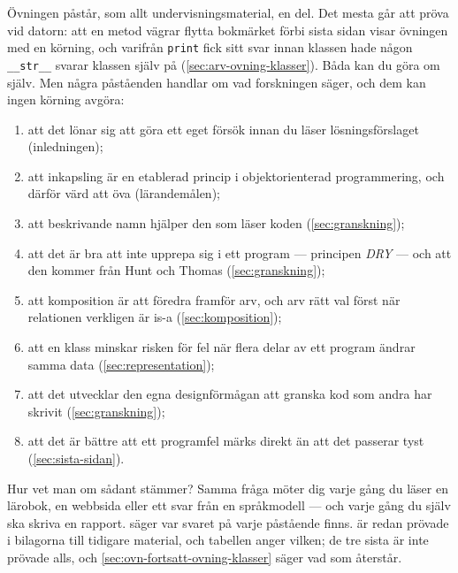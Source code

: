 Övningen påstår, som allt undervisningsmaterial, en del.  Det mesta går
att pröva vid datorn: att en metod vägrar flytta bokmärket förbi sista
sidan visar övningen med en körning, och varifrån
\texttt{print} fick sitt svar innan klassen hade någon
\texttt{__str__} svarar klassen själv på
(\cref{sec:arv-ovning-klasser}).  Båda kan du göra om själv.  Men
några påståenden handlar om vad forskningen säger, och dem kan ingen
körning avgöra:
\begin{enumerate}
  \item att det lönar sig att göra ett eget försök innan du läser
    lösningsförslaget (inledningen);
  \item att inkapsling är en etablerad princip i objektorienterad
    programmering, och därför värd att öva (lärandemålen);
  \item att beskrivande namn hjälper den som läser koden
    (\cref{sec:granskning});
  \item att det är bra att inte upprepa sig i ett program --- principen
    \emph{DRY} --- och att den kommer från Hunt och Thomas
    (\cref{sec:granskning});
  \item att komposition är att föredra framför arv, och arv rätt val
    först när relationen verkligen är
    \foreignlanguage{english}{is-a} (\cref{sec:komposition});
  \item att en klass minskar risken för fel när flera delar av ett
    program ändrar samma data (\cref{sec:representation});
  \item att det utvecklar den egna designförmågan att granska kod som
    andra har skrivit (\cref{sec:granskning});
  \item att det är bättre att ett programfel märks direkt än att det
    passerar tyst (\cref{sec:sista-sidan}).
\end{enumerate}
Hur vet man om sådant stämmer?  Samma fråga möter dig varje gång du
läser en lärobok, en webbsida eller ett svar från en språkmodell ---
och varje gång du själv ska skriva en rapport.
 säger var svaret på varje påstående finns.
 är redan prövade i
bilagorna till tidigare material, och tabellen anger vilken; de tre
sista är inte prövade alls, och \cref{sec:ovn-fortsatt-ovning-klasser}
säger vad som återstår.

